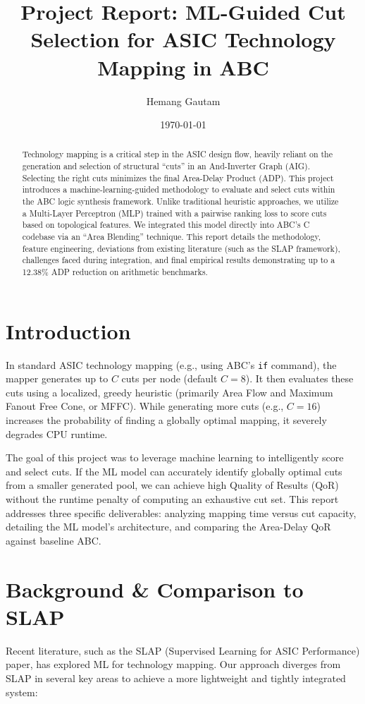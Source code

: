 \documentclass[11pt,a4paper]{article}
\title{\textbf{Project Report: ML-Guided Cut Selection for ASIC Technology Mapping in ABC}}
\author{Hemang Gautam}
\date{\today}
\begin{document}
\maketitle

\begin{abstract}
Technology mapping is a critical step in the ASIC design flow, heavily reliant on the generation and selection of structural ``cuts'' in an And-Inverter Graph (AIG). Selecting the right cuts minimizes the final Area-Delay Product (ADP). This project introduces a machine-learning-guided methodology to evaluate and select cuts within the ABC logic synthesis framework. Unlike traditional heuristic approaches, we utilize a Multi-Layer Perceptron (MLP) trained with a pairwise ranking loss to score cuts based on topological features. We integrated this model directly into ABC's C codebase via an ``Area Blending'' technique. This report details the methodology, feature engineering, deviations from existing literature (such as the SLAP framework), challenges faced during integration, and final empirical results demonstrating up to a 12.38\% ADP reduction on arithmetic benchmarks.
\end{abstract}

\section{Introduction}
In standard ASIC technology mapping (e.g., using ABC's \texttt{if} command), the mapper generates up to $C$ cuts per node (default $C=8$). It then evaluates these cuts using a localized, greedy heuristic (primarily Area Flow and Maximum Fanout Free Cone, or MFFC). While generating more cuts (e.g., $C=16$) increases the probability of finding a globally optimal mapping, it severely degrades CPU runtime. 

The goal of this project was to leverage machine learning to intelligently score and select cuts. If the ML model can accurately identify globally optimal cuts from a smaller generated pool, we can achieve high Quality of Results (QoR) without the runtime penalty of computing an exhaustive cut set. This report addresses three specific deliverables: analyzing mapping time versus cut capacity, detailing the ML model's architecture, and comparing the Area-Delay QoR against baseline ABC.

\section{Background \& Comparison to SLAP}
Recent literature, such as the SLAP (Supervised Learning for ASIC Performance) paper, has explored ML for technology mapping. Our approach diverges from SLAP in several key areas to achieve a more lightweight and tightly integrated system:
\end{document}
